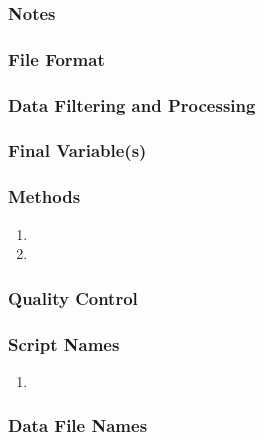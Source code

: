 \subsubsection*{Notes}

\subsubsection*{File Format}

\subsubsection*{Data Filtering and Processing}

\subsubsection*{Final Variable(s)}

\subsubsection*{Methods}

\begin{enumerate}
\item 
\item
\end{enumerate}

\subsubsection*{Quality Control}

\subsubsection*{Script Names}

\begin{enumerate}
\item 
\end{enumerate}

\subsubsection*{Data File Names}

